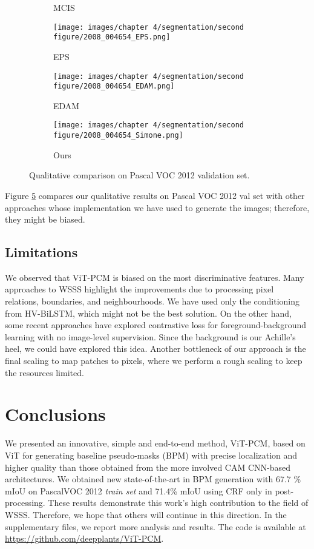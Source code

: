 \documentclass[runningheads]{styles/llncs}
\begin{document}
\begin{figure}[t]
\begin{subfigure}[b]{.11\linewidth}
\caption{MCIS}\label{fig:dole}
\end{subfigure}
\begin{subfigure}[b]{.11\linewidth}
\texttt{[image: images/chapter 4/segmentation/second figure/2008\_004654\_EPS.png]}
\caption{EPS}\label{fig:dolf}
\end{subfigure}
\begin{subfigure}[b]{.11\linewidth}
\texttt{[image: images/chapter 4/segmentation/second figure/2008\_004654\_EDAM.png]}
\caption{EDAM}\label{fig:dolg}
\end{subfigure}
\begin{subfigure}[b]{.11\linewidth}
\texttt{[image: images/chapter 4/segmentation/second figure/2008\_004654\_Simone.png]}
\caption{Ours}\label{fig:dolh}
\end{subfigure}

\caption{Qualitative comparison on Pascal VOC 2012 validation set.}\label{fig:qual6}
\end{figure}

 \noindent
Figure \ref{fig:qual6} compares our qualitative results on Pascal VOC 2012 val set with other approaches whose implementation we have used to generate the images; therefore, they might be biased.

\subsection{Limitations}
We observed that ViT-PCM is biased on the most discriminative features.
Many approaches to WSSS highlight the improvements due to processing pixel relations, boundaries, and neighbourhoods. We have used only the conditioning from HV-BiLSTM, which might not be the best solution. On the other hand, some recent approaches have explored contrastive loss for foreground-background learning with no image-level supervision. Since the background is our Achille's heel, we could have explored this idea. Another bottleneck of our approach is the final scaling to map patches to pixels, where we perform a rough scaling to keep the resources limited.  


\section{Conclusions}


We presented an innovative, simple and end-to-end method, ViT-PCM, based on ViT for generating baseline pseudo-masks (BPM) with precise localization and higher quality than those obtained from the more involved CAM CNN-based architectures. We obtained new state-of-the-art in BPM generation with 67.7 \% mIoU on PascalVOC 2012 {\em train set}  and 71.4\% mIoU using  CRF only in post-processing. These results demonstrate this work's high contribution to the field of WSSS. Therefore, we hope that others will continue in this direction. In the supplementary files, we report more analysis and results. The code is available at \url{https://github.com/deepplants/ViT-PCM}.


\end{document}
